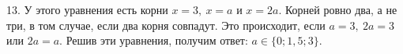 13. У этого уравнения есть корни $x=3,\ x=a$ и $x=2a.$ Корней ровно два, а не три, в том случае, если два корня совпадут. Это происходит, если $a=3,\ 2a=3$ или $2a=a.$ Решив эти уравнения, получим ответ: $a\in\{0; 1,5;3\}.$\\
